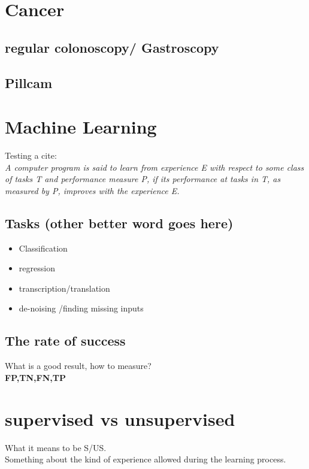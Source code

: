 \documentclass[a4paper,english]{ifimaster}
\begin{document}
	\section{Cancer}
	  \subsection{regular colonoscopy/ Gastroscopy}
	  \subsection{Pillcam}
	  
	  
	\section{Machine Learning}



	Testing a cite:\\

	\textit{ A computer program is said to learn from experience E with respect to 
	some class of tasks T and performance measure P, if its performance at
	tasks in T, as measured by P, improves with the experience E. } 
	\cite{MitchellTomM1997Ml}
	  \subsection{Tasks (other better word goes here)}
\label{chap:Tasks}
\begin{itemize}
 \item Classification
 \item regression 
 \item transcription/translation
 \item de-noising /finding missing inputs
\end{itemize}
\subsection{The rate of success}
What is a good result, how to measure?\\
\textbf{FP,TN,FN,TP}\\


\section{supervised vs unsupervised}
What it means to be S/US.\\
Something about the kind of experience allowed during the learning process.
\end{document}
